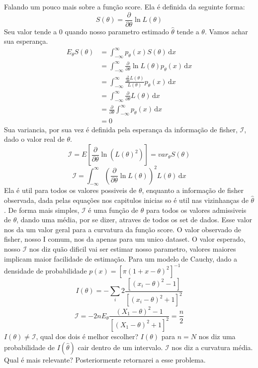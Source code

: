 Falando um pouco mais sobre a função score. Ela é definida da seguinte forma:
\begin{equation}
    S(\theta)=\frac{\partial}{\partial \theta } \ln L(\theta )
\end{equation}
Seu valor tende a 0 quando nosso parametro estimado \(\hat{\theta} \) tende a \(\theta \). Vamos
achar sua esperança.
\begin{align}
    \label{eq:Esperanca do score}
    E_{\theta }S(\theta)&=\int_{-\infty}^{\infty} p_{\theta } (x)S(\theta ) \,\mathrm{d}x\\
    &=\int_{-\infty}^{\infty} \frac{\partial }{\partial \theta } \ln L(\theta )p_{\theta } (x) \,\mathrm{d}x\\
    &=\int_{-\infty}^{\infty} \frac{\frac{\partial }{\partial \theta } L(\theta )}{L(\theta )}p_{\theta } (x) \,\mathrm{d}x\\
    &=\int_{-\infty}^{\infty} \frac{\partial }{\partial \theta } L(\theta )\,\mathrm{d}x\\
    &=\frac{\partial }{\partial \theta }\int_{-\infty}^{\infty}  p_{\theta } (x)\,\mathrm{d}x\\
    &=0
\end{align}
Sua variancia, por sua vez é definida pela esperança da informação de fisher, \(\mathcal{I}\), dado
o valor real de \(\theta \).
\begin{equation}
    \mathcal{I} =E[\frac{\partial}{\partial \theta } \ln (L(\theta )^{2})]=var_{\theta} S(\theta) 
\end{equation}
\begin{equation}
    \mathcal{I}=\int_{-\infty}^{\infty} (\frac{\partial }{\partial \theta } \ln L(\theta))^{2}  L(\theta)\,\mathrm{d}x 
\end{equation}
Ela é util para todos os valores possiveis de \(\theta \), enquanto a
informação de fisher observada, dada pelas equações nos capitulos inicias so é util nas vizinhanças
de \(\hat{\theta} \). De forma mais simples, \(\mathcal{I} \) é uma função de \(\theta \) para todos
os valores admissiveis de \(\theta \), dando uma média, por se dizer, atraves de todos os set de
dados. Esse valor nos da um valor geral para a curvatura da função score. O valor observado de
fisher, nosso I comum, nos da apenas para um unico dataset. O valor esperado, nosso \(\mathcal{I} \)
nos diz quão dificil vai  ser estimar nosso parametro, valores maiores implicam maior facilidade de
estimação. Para um modelo de Cauchy, dado a densidade de probabilidade \(p(x)=[\pi (1+x-\theta )^{2}]^{-1}\)
\[
    I(\theta )=-\sum_{i} 2\frac{[(x_{i}-\theta)^{2}-1 ]}{[(x_{i}-\theta)^{2}+1 ]^{2} }
\]
\[
    \mathcal{I} =-2nE_{\theta }\frac{(X_1-\theta )^{2} -1}{[(X_{1}-\theta)^{2}+1 ]^{2}}=\frac{n}{2} 
\]
\(I(\theta ) \neq \mathcal{I}\), qual dos dois é melhor escolher? \(I(\theta )\) para \(n=N\) nos
diz uma probabilidade de \(I(\hat{\theta}  )\) cair dentro de um intervalo. \(\mathcal{I} \) nos diz
a curvatura média. Qual é mais relevante? Posteriormente retornarei a esse problema. \par

